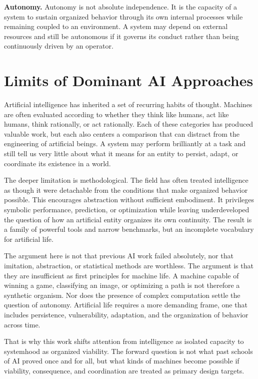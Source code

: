 \documentclass[a4paper,english]{article}
\begin{document}
\textbf{Autonomy.} Autonomy is not absolute independence. It is the capacity of a system
to sustain organized behavior through its own internal processes while
remaining coupled to an environment. A system may depend on external
resources and still be autonomous if it governs its conduct rather
than being continuously driven by an operator.

\section{Limits of Dominant AI Approaches}

Artificial intelligence has inherited a set of recurring habits of
thought. Machines are often evaluated according to whether they think
like humans, act like humans, think rationally, or act rationally.
Each of these categories has produced valuable work, but each also
centers a comparison that can distract from the engineering of artificial
beings. A system may perform brilliantly at a task and still tell
us very little about what it means for an entity to persist, adapt,
or coordinate its existence in a world.

The deeper limitation is methodological. The field has often treated
intelligence as though it were detachable from the conditions that
make organized behavior possible. This encourages abstraction without
sufficient embodiment. It privileges symbolic performance, prediction,
or optimization while leaving underdeveloped the question of how an
artificial entity organizes its own continuity. The result is a family
of powerful tools and narrow benchmarks, but an incomplete vocabulary
for artificial life.

The argument here is not that previous AI work failed absolutely,
nor that imitation, abstraction, or statistical methods are worthless.
The argument is that they are insufficient as first principles for
machine life. A machine capable of winning a game, classifying an
image, or optimizing a path is not therefore a synthetic organism.
Nor does the presence of complex computation settle the question of
autonomy. Artificial life requires a more demanding frame, one that
includes persistence, vulnerability, adaptation, and the organization
of behavior across time.

That is why this work shifts attention from intelligence as isolated
capacity to systemhood as organized viability. The forward question
is not what past schools of AI proved once and for all, but what kinds
of machines become possible if viability, consequence, and coordination
are treated as primary design targets.
\end{document}

